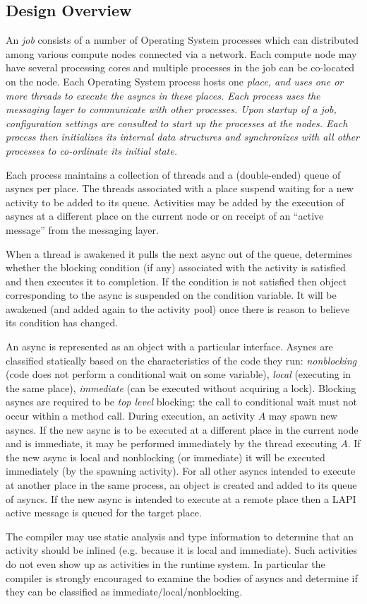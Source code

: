 \subsection{Design Overview}

An \Xten{} {\em job} consists of a number of \Xten{} Operating System
processes which can distributed among various compute nodes connected
via a network. Each compute node may have several processing cores and
multiple processes in the job can be co-located on the node. Each
Operating System process hosts one \Xten{} \em{place}, and uses one or
more threads to execute the asyncs in these places.
Each process uses the messaging layer to communicate with other
processes. Upon startup of a job, configuration settings are consulted 
to start up the processes at the nodes. Each process then initializes
its internal data structures and synchronizes with all other processes
to co-ordinate its initial state.

Each process maintains a collection of threads and a (double-ended)
queue of asyncs per place. The threads associated with a place suspend
waiting for a new activity to be added to its queue. Activities may be
added by the execution of asyncs at a different place on the current
node or on receipt of an ``active message'' from the messaging layer.

When a thread is awakened it pulls the next async out of the queue,
determines whether the blocking condition (if any) associated with the
activity is satisfied and then executes it to completion. If the
condition is not satisfied then object corresponding to the async is
suspended on the condition variable. It will be awakened (and added
again to the activity pool) once there is reason to believe its
condition has changed.

An async is represented as an object with a particular interface.
Asyncs are classified statically based on the characteristics of the
code they run: {\em nonblocking} (code does not perform a conditional
wait on some variable), {\em local} (executing in the same place), {\em
immediate} (can be executed without acquiring a lock). Blocking asyncs
are required to be {\em top level} blocking: the call to conditional
wait must not occur within a method call. During execution, an activity
$A$ may spawn new asyncs. If the new async is to be executed at a
different place in the current node and is immediate, it may be
performed immediately by the thread executing $A$.  If the new async is
local and nonblocking (or immediate) it will be executed immediately (by
the spawning activity).  For all other asyncs intended to execute at
another place in the same process, an object is created and added to its
queue of asyncs. If the new async is intended to execute at a remote
place then a LAPI active message is queued for the target place. 

The compiler may use static analysis and type information to
determine that an activity should be inlined (e.g.{} because it is
local and immediate). Such activities do not even show up as
activities in the runtime system. In particular the compiler is
strongly encouraged to examine the bodies of asyncs and determine if
they can be classified as immediate/local/nonblocking.
